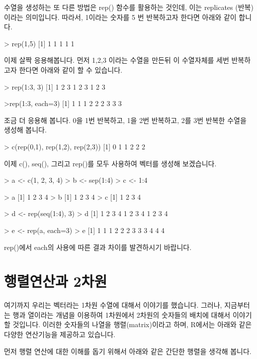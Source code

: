 수열을 생성하는 또 다른 방법은 rep() 함수를 활용하는 것인데, 이는 replicates (반복)이라는 의미입니다.
따라서, 1이라는 숫자를 5 번 반복하고자 한다면 아래와 같이 합니다. 

\begin{Schunk}
\begin{Soutput}
> rep(1,5)
[1] 1 1 1 1 1
\end{Soutput}
\end{Schunk}

이제 살짝 응용해봅니다.  
먼저 1,2,3 이라는 수열을 만든뒤 이 수열자체를 세번 반복하고자 한다면 아래와 같이 할 수 있습니다. 

\begin{Schunk}
\begin{Soutput}
> rep(1:3, 3)
[1] 1 2 3 1 2 3 1 2 3	
\end{Soutput}
\end{Schunk}
>rep(1:3, each=3)
[1] 1 1 1 2 2 2 3 3 3

조금 더 응용해 봅니다. 
0을 1번 반복하고, 1을 2번 반복하고, 2를 3번 반복한 수열을 생성해 봅니다. 

\begin{Schunk}
\begin{Soutput}
> c(rep(0,1), rep(1,2), rep(2,3))
[1] 0 1 1 2 2 2
\end{Soutput}
\end{Schunk}

이제 c(), seq(), 그리고 rep()를 모두 사용하여 벡터를 생성해 보겠습니다.

> a <- c(1, 2, 3, 4)
> b <- sep(1:4)
> c <- 1:4

> a
[1] 1 2 3 4
> b
[1] 1 2 3 4
> c
[1] 1 2 3 4

> d <- rep(seq(1:4), 3)
> d
[1] 1 2 3 4 1 2 3 4 1 2 3 4

> e <- rep(a, each=3)
> e
[1] 1 1 1 2 2 2 3 3 3 4 4 4

rep()에서 each의 사용에 따른 결과 차이를 발견하시기 바랍니다.

\section{행렬연산과 2차원}

여기까지 우리는 벡터라는 1차원 수열에 대해서 이야기를 했습니다. 
그러나, 지금부터는 행과 열이라는 개념을 이용하여 1차원에서 2차원의 숫자들의 배치에 대해서 이야기 할 것입니다. 
이러한 숫자들의 나열을 행렬(matrix)이라고 하며, R에서는 아래와 같은 다양한 연산기능을 제공하고 있습니다. 

먼저 행렬 연산에 대한 이해를 돕기 위해서 아래와 같은 간단한 행렬을 생각해 봅니다. 

